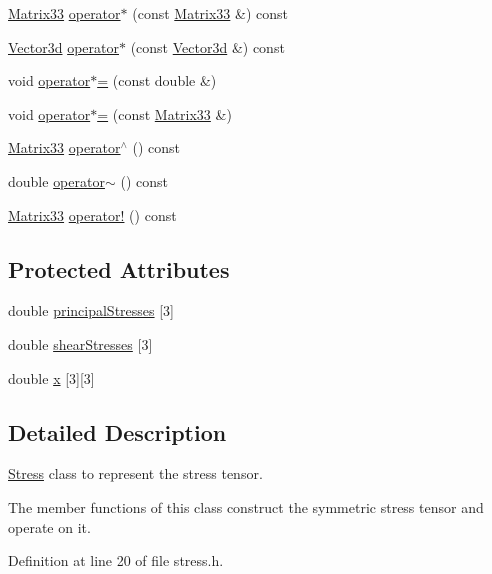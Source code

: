 \begin{DoxyCompactItemize}
\hyperlink{classMatrix33}{Matrix33} \hyperlink{classMatrix33_a525f14614255ff81c0cbab8060e8e065}{operator$\ast$} (const \hyperlink{classMatrix33}{Matrix33} \&) const 
\item 
\hyperlink{classVector3d}{Vector3d} \hyperlink{classMatrix33_a601584a1edbaae7c6a2a2874605d6f61}{operator$\ast$} (const \hyperlink{classVector3d}{Vector3d} \&) const 
\item 
void \hyperlink{classMatrix33_a83162791813bef030b1ceb5df3c5cae3}{operator$\ast$=} (const double \&)
\item 
void \hyperlink{classMatrix33_ac3937bdeb034cc83b4adcad16cd58a26}{operator$\ast$=} (const \hyperlink{classMatrix33}{Matrix33} \&)
\item 
\hyperlink{classMatrix33}{Matrix33} \hyperlink{classMatrix33_ad4ab7b9674a44a297502282e1993ef54}{operator$^\wedge$} () const 
\item 
double \hyperlink{classMatrix33_a15b37caa6ab0d9f4a9f0d95846abd675}{operator$\sim$} () const 
\item 
\hyperlink{classMatrix33}{Matrix33} \hyperlink{classMatrix33_a1b822a20343a26b3c9bb7fd5c1247f37}{operator!} () const 
\end{DoxyCompactItemize}
\subsection*{Protected Attributes}
\begin{DoxyCompactItemize}
\item 
double \hyperlink{classStress_aea8c3e40aa59a89d7ba79d2c916050a6}{principal\-Stresses} \mbox{[}3\mbox{]}
\item 
double \hyperlink{classStress_a77e8705e56c2fb56826a638edf3f78bf}{shear\-Stresses} \mbox{[}3\mbox{]}
\item 
double \hyperlink{classMatrix33_af7f01fa466616eb7c8eda2e4d9f85cdd}{x} \mbox{[}3\mbox{]}\mbox{[}3\mbox{]}
\end{DoxyCompactItemize}


\subsection{Detailed Description}
\hyperlink{classStress}{Stress} class to represent the stress tensor. 

The member functions of this class construct the symmetric stress tensor and operate on it. 

Definition at line 20 of file stress.\-h.



